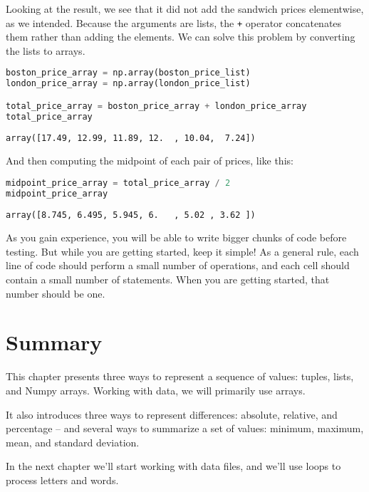 Looking at the result, we see that it did not add the sandwich prices
elementwise, as we intended. Because the arguments are lists, the
\passthrough{\lstinline!+!} operator concatenates them rather than
adding the elements. We can solve this problem by converting the lists
to arrays.

\begin{lstlisting}[language=Python,style=source]
boston_price_array = np.array(boston_price_list)
london_price_array = np.array(london_price_list)

total_price_array = boston_price_array + london_price_array
total_price_array
\end{lstlisting}

\begin{lstlisting}[style=output]
array([17.49, 12.99, 11.89, 12.  , 10.04,  7.24])
\end{lstlisting}

And then computing the midpoint of each pair of prices, like this:

\begin{lstlisting}[language=Python,style=source]
midpoint_price_array = total_price_array / 2
midpoint_price_array
\end{lstlisting}

\begin{lstlisting}[style=output]
array([8.745, 6.495, 5.945, 6.   , 5.02 , 3.62 ])
\end{lstlisting}

As you gain experience, you will be able to write bigger chunks of code
before testing. But while you are getting started, keep it simple! As a
general rule, each line of code should perform a small number of
operations, and each cell should contain a small number of statements.
When you are getting started, that number should be one.

\hypertarget{summary}{%
\section{Summary}\label{summary}}

This chapter presents three ways to represent a sequence of values:
tuples, lists, and Numpy arrays. Working with data, we will primarily
use arrays.

It also introduces three ways to represent differences: absolute,
relative, and percentage -- and several ways to summarize a set of
values: minimum, maximum, mean, and standard deviation.

In the next chapter we'll start working with data files, and we'll use
loops to process letters and words.

